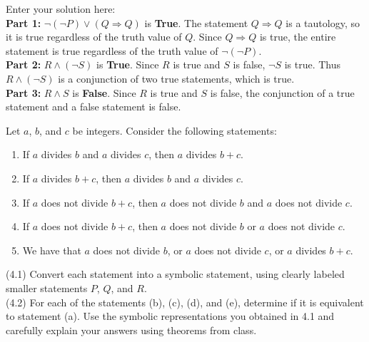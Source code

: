 \documentclass[10pt]{exam}
\begin{document}
\begin{questions}

\begin{solution}
Enter your solution here: \\
\textbf{Part 1:} $\neg(\neg P) \vee (Q \Rightarrow Q)$ is \textbf{True}. The statement $Q \Rightarrow Q$ is a tautology, so it is true regardless of the truth value of $Q$. Since $Q \Rightarrow Q$ is true, the entire statement is true regardless of the truth value of $\neg(\neg P)$.\\

\textbf{Part 2:} $R \wedge (\neg S)$ is \textbf{True}. Since $R$ is true and $S$ is false, $\neg S$ is true. Thus $R \wedge (\neg S)$ is a conjunction of two true statements, which is true.\\

\textbf{Part 3:} $R \wedge S$ is \textbf{False}. Since $R$ is true and $S$ is false, the conjunction of a true statement and a false statement is false.
\end{solution}

\question Let $a$, $b$, and $c$ be integers. Consider the following statements:
\begin{enumerate}[label=(\alph*)]
    \item If $a$ divides $b$ and $a$ divides $c$, then $a$ divides $b+c$.
    \item If $a$ divides $b+c$, then $a$ divides $b$ and $a$ divides $c$.
    \item If $a$ does not divide $b+c$, then $a$ does not divide $b$ and $a$ does not divide $c$.
    \item If $a$ does not divide $b+c$, then $a$ does not divide $b$ or $a$ does not divide $c$.
    \item We have that $a$ does not divide $b$, or $a$ does not divide $c$, or $a$ divides $b+c$.
\end{enumerate}

(4.1)
Convert each statement into a symbolic statement, using clearly labeled smaller statements $P$, $Q$, and $R$.\\
(4.2)
For each of the statements (b), (c), (d), and (e), determine if it is equivalent to statement (a). Use the symbolic representations you obtained in 4.1 and carefully explain your answers using theorems from class.


\end{questions}
\end{document}
